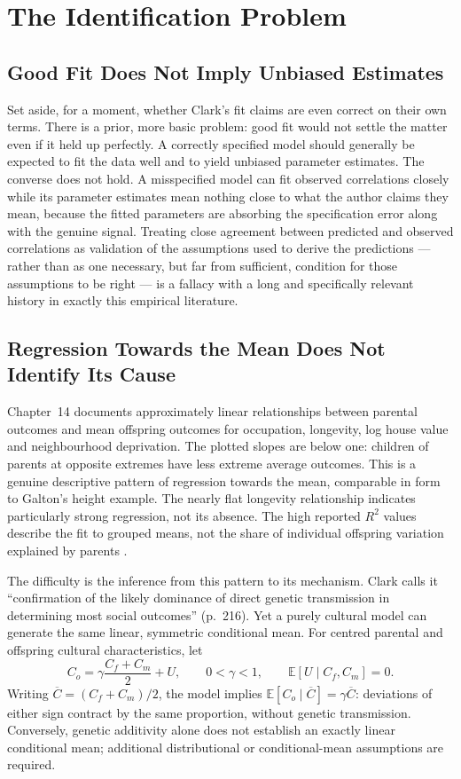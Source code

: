 \documentclass[12pt]{article}
\begin{document}
\section{The Identification Problem}

\subsection{Good Fit Does Not Imply Unbiased Estimates}

Set aside, for a moment, whether Clark's fit claims are even correct on their
own terms. There is a prior, more basic problem: good fit would not settle
the matter even if it held up perfectly. A correctly specified model should
generally be expected to fit the data well and to yield unbiased parameter
estimates. The converse does not hold. A misspecified model can fit
observed correlations closely while its parameter estimates mean nothing
close to what the author claims they mean, because the fitted parameters are
absorbing the specification error along with the genuine signal. Treating
close agreement between predicted and observed correlations as validation of
the assumptions used to derive the predictions --- rather than as one
necessary, but far from sufficient, condition for those assumptions to be
right --- is a fallacy with a long and specifically relevant history in
exactly this empirical literature.

\subsection{Regression Towards the Mean Does Not Identify Its Cause}
\label{sec:regression-mean}

Chapter~14 documents approximately linear relationships between parental
outcomes and mean offspring outcomes for occupation, longevity, log house
value and neighbourhood deprivation. The plotted slopes are below one:
children of parents at opposite extremes have less extreme average
outcomes. This is a genuine descriptive pattern of regression towards the
mean, comparable in form to Galton's height example. The nearly flat
longevity relationship indicates particularly strong regression, not its
absence. The high reported $R^2$ values describe the fit to grouped means,
not the share of individual offspring variation explained by parents
\citep[pp.~210--216]{Clark2026}.

The difficulty is the inference from this pattern to its mechanism.
Clark calls it ``confirmation of the likely dominance of direct genetic
transmission in determining most social outcomes'' (p.~216). Yet a purely
cultural model can generate the same linear, symmetric conditional mean.
For centred parental and offspring cultural characteristics, let
\[
 C_o=\gamma\frac{C_f+C_m}{2}+U,\qquad
 0<\gamma<1,\qquad \mathbb E[U\mid C_f,C_m]=0.
\]
Writing $\overline C=(C_f+C_m)/2$, the model implies
$\mathbb E[C_o\mid\overline C]=\gamma\overline C$: deviations of either
sign contract by the same proportion, without genetic transmission.
Conversely, genetic additivity alone does not establish an exactly linear
conditional mean; additional distributional or conditional-mean assumptions
are required.
\end{document}

